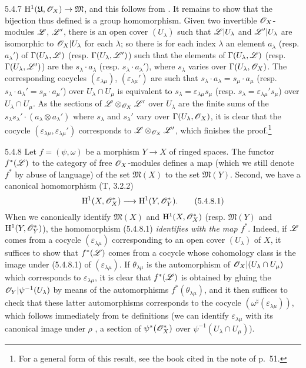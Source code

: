 \begin{env}{5.4.7}
$\mathrm{H}^1(\mathfrak{U},\mathscr{O}_X)\to\mathfrak{M}$, and this follows from . It
remains to show that
the bijection thus defined is a group homomorphism. Given two invertible $\mathscr{O}_X$-modules
$\mathscr{L}$, $\mathscr{L}'$, there is an open cover $(U_\lambda)$ such that $\mathscr{L}|U_\lambda$ and
$\mathscr{L}'|U_\lambda$ are isomorphic to $\mathscr{O}_X|U_\lambda$ for each $\lambda$; so there is for
each index $\lambda$ an element $a_\lambda$ (resp. $a_\lambda'$) of
$\Gamma(U_\lambda,\mathscr{L})$ (resp. $\Gamma(U_\lambda,\mathscr{L}')$) such that the elements of
$\Gamma(U_\lambda,\mathscr{L})$ (resp. $\Gamma(U_\lambda,\mathscr{L}')$) are the
$s_\lambda\cdot a_\lambda$ (resp. $s_\lambda\cdot a_\lambda'$), where $s_\lambda$ varies over
$\Gamma(U_\lambda,\mathscr{O}_X)$. The corresponding cocycles $(\varepsilon_{\lambda\mu})$,
$(\varepsilon_{\lambda\mu}')$ are such that $s_\lambda\cdot a_\lambda=s_\mu\cdot a_\mu$
(resp. $s_\lambda\cdot a_\lambda'=s_\mu\cdot a_\mu'$) over $U_\lambda\cap U_\mu$ is
equivalent to $s_\lambda=\varepsilon_{\lambda\mu}s_\mu$
(resp. $s_\lambda=\varepsilon_{\lambda\mu}'s_\mu$) over $U_\lambda\cap U_\mu$. As the
sections of $\mathscr{L}\otimes_{\mathscr{O}_X}\mathscr{L}'$ over $U_\lambda$ are the finite sums of the
$s_\lambda s_\lambda'\cdot(a_\lambda\otimes a_\lambda')$ where $s_\lambda$ and $s_\lambda'$
vary over $\Gamma(U_\lambda,\mathscr{O}_X)$, it is clear that the cocycle
$(\varepsilon_{\lambda\mu},\varepsilon_{\lambda\mu}')$ corresponds to
$\mathscr{L}\otimes_{\mathscr{O}_X}\mathscr{L}'$, which finishes the proof.\footnote{For a general form of this
result, see the book cited in the note of p.~51.}
\end{env}

\begin{env}{5.4.8}
\label{env-0.5.4.8}
Let $f=(\psi,\omega)$ be a morphism $Y\to X$ of ringed spaces. The functor $f^*(\mathscr{L})$ to
the category of free $\mathscr{O}_X$-modules defines a map (which we still denote $f^*$ by abuse of
language) of the set $\mathfrak{M}(X)$ to the set $\mathfrak{M}(Y)$. Second, we have a
canonical homomorphism (T, 3.2.2)
\[
  \mathrm{H}^1(X,\mathscr{O}_X^*)\longrightarrow\mathrm{H}^1(Y,\mathscr{O}_Y^*).
  \tag{5.4.8.1}
\]
When we canonically identify  $\mathfrak{M}(X)$ and $\mathrm{H}^1(X,\mathscr{O}_X^*)$
(resp. $\mathfrak{M}(Y)$ and $\mathrm{H}^1(Y,\mathscr{O}_Y^*)$), the homomorphism (5.4.8.1) \emph{identifies
with the map $f^*$}. Indeed, if $\mathscr{L}$ comes from a cocycle $(\varepsilon_{\lambda\mu})$
corresponding to an open cover $(U_\lambda)$ of $X$, it suffices to show that $f^*(\mathscr{L})$
comes from a cocycle whose cohomology class is the image under (5.4.8.1) of
$(\varepsilon_{\lambda\mu})$. If $\theta_{\lambda\mu}$ is the automorphism of
$\mathscr{O}_X|(U_\lambda\cap U_\mu)$ which corresponds to $\varepsilon_{\lambda\mu}$, it is clear
that $f^*(\mathscr{L})$ is obtained by gluing the $\mathscr{O}_Y|\psi^{-1}(U_\lambda)$ by means of the
automorphisms $f^*(\theta_{\lambda\mu})$, and it then suffices to check that these latter
automorphisms corresponds to the cocycle $(\omega^\sharp(\varepsilon_{\lambda\mu}))$, which
follows immediately from te definitions (we can identify $\varepsilon_{\lambda\mu}$ with its
canonical image under $\rho$ , a section of $\psi^*(\mathscr{O}_X^*)$ over
$\psi^{-1}(U_\lambda\cap U_\mu)$).
\end{env}

